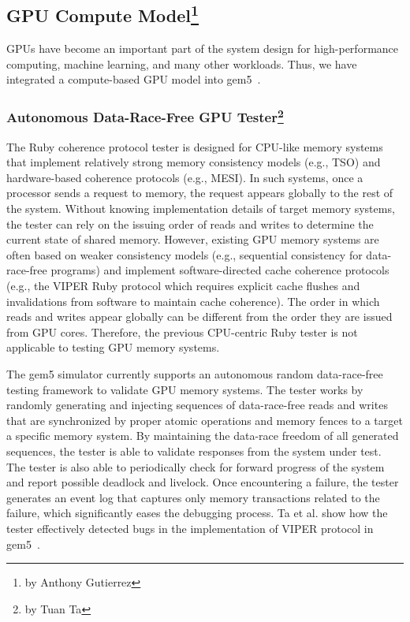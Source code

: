 \subsection[GPU Compute Model]{GPU Compute Model\footnote{by Anthony Gutierrez}}
\label{sec:gpu}

GPUs have become an important part of the system design for high-performance computing, machine learning, and many other workloads.
Thus, we have integrated a compute-based GPU model into gem5~\cite{GutierrezBeckmann2018-amdAPU}.

\subsubsection[Autonomous Data-Race-Free GPU Tester]{Autonomous Data-Race-Free GPU Tester\footnote{by Tuan Ta}}

The Ruby coherence protocol tester is designed for CPU-like memory systems that implement relatively strong memory consistency models (e.g., TSO) and hardware-based coherence protocols (e.g., MESI).
In such systems, once a processor sends a request to memory, the request appears globally to the rest of the system.
Without knowing implementation details of target memory systems, the tester can rely on the issuing order of reads and writes to determine the current state of shared memory.
However, existing GPU memory systems are often based on weaker consistency models (e.g., sequential consistency for data-race-free programs) and implement software-directed cache coherence protocols (e.g., the VIPER Ruby protocol which requires explicit cache flushes and invalidations from software to maintain cache coherence).
The order in which reads and writes appear globally can be different from the order they are issued from GPU cores.
Therefore, the previous CPU-centric Ruby tester is not applicable to testing GPU memory systems.

The gem5 simulator currently supports an autonomous random data-race-free testing framework to validate GPU memory systems.
The tester works by randomly generating and injecting sequences of data-race-free reads and writes that are synchronized by proper atomic operations and memory fences to a target a specific memory system.
By maintaining the data-race freedom of all generated sequences, the tester is able to validate responses from the system under test.
The tester is also able to periodically check for forward progress of the system and report possible deadlock and livelock.
Once encountering a failure, the tester generates an event log that captures only memory transactions related to the failure, which significantly eases the debugging process.
Ta et al. show how the tester effectively detected bugs in the implementation of VIPER protocol in gem5~\cite{Ta2019gputesting}.
